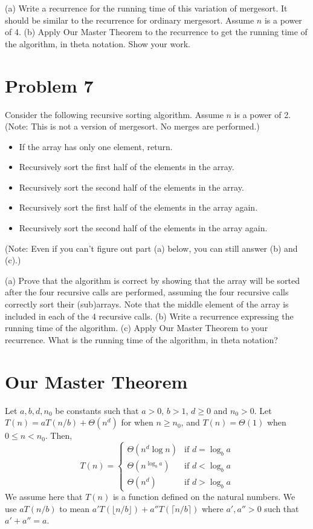 \documentclass{article}
\begin{document}
(a) Write a recurrence for the running time of this variation of mergesort. It should be similar to the recurrence for ordinary mergesort. Assume $n$ is a power of 4.
(b) Apply Our Master Theorem to the recurrence to get the running time of the algorithm, in theta notation. Show your work.


\section*{Problem 7}
Consider the following recursive sorting algorithm. Assume $n$ is a power of 2. (Note: This is not a version of mergesort. No merges are performed.)

\begin{itemize}
    \item If the array has only one element, return.
    \item Recursively sort the first half of the elements in the array.
    \item Recursively sort the second half of the elements in the array.
    \item Recursively sort the first half of the elements in the array again.
    \item Recursively sort the second half of the elements in the array again.

\end{itemize}
(Note: Even if you can’t figure out part (a) below, you can still answer (b) and (c).)

(a) Prove that the algorithm is correct by showing that the array will be sorted after the four recursive calls are performed, assuming the four recursive calls correctly sort their (sub)arrays. Note that the middle element of the array is included in each of the 4 recursive calls.
(b) Write a recurrence expressing the running time of the algorithm.
(c) Apply Our Master Theorem to your recurrence. What is the running time of the algorithm, in theta notation?


\section*{Our Master Theorem}
\begin{theorem}
Let $a, b, d, n_0$ be constants such that $a > 0$, $b > 1$, $d \ge 0$ and $n_0 > 0$.
Let $T(n) = aT(n/b) + \Theta(n^d)$ for when $n \ge n_0$, and $T(n) = \Theta(1)$ when $0 \le n < n_0$. Then,
\[
T(n) = \begin{cases}
\Theta(n^d \log n) & \text{if } d = \log_b a \\
\Theta(n^{\log_b a}) & \text{if } d < \log_b a \\
\Theta(n^d) & \text{if } d > \log_b a
\end{cases}
\]
We assume here that $T(n)$ is a function defined on the natural numbers. We use $aT(n/b)$ to mean $a'T(\lfloor n/b \rfloor) + a''T(\lceil n/b \rceil)$ where $a', a'' > 0$ such that $a' + a'' = a$.
\end{theorem}
\end{document}
